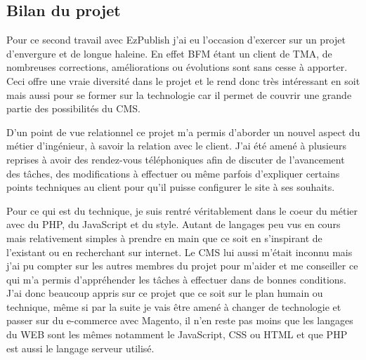 \documentclass[a4paper,11pt,twoside]{report}
\begin{document}
    \subsection*{Bilan du projet}
    Pour ce second travail avec EzPublish j'ai eu l'occasion d'exercer sur un projet d'envergure et de longue haleine. En effet BFM étant un client de TMA, de nombreuses corrections, améliorations ou évolutions sont sans cesse à apporter. Ceci offre une vraie diversité dans le projet et le rend donc très intéressant en soit mais aussi pour se former sur la technologie car il permet de couvrir une grande partie des possibilités du CMS. 
    
    D'un point de vue relationnel ce projet m'a permis d'aborder un nouvel aspect du métier d'ingénieur, à savoir la relation avec le client. J'ai été amené à plusieurs reprises à avoir des rendez-vous téléphoniques afin de discuter de l'avancement des tâches, des modifications à effectuer ou même parfois d'expliquer certains points techniques au client pour qu'il puisse configurer le site à ses souhaits. 
    
    Pour ce qui est du technique, je suis rentré véritablement dans le coeur du métier avec du PHP, du JavaScript et du style. Autant de langages peu vus en cours mais relativement simples à prendre en main que ce soit en s'inspirant de l'existant ou en recherchant sur internet. Le CMS lui aussi m'était inconnu mais j'ai pu compter sur les autres membres du projet pour m'aider et me conseiller ce qui m'a permis d'appréhender les tâches à effectuer dans de bonnes conditions. J'ai donc beaucoup appris sur ce projet que ce soit sur le plan humain ou technique, même si par la suite je vais être amené à changer de technologie et passer sur du e-commerce avec Magento, il n'en reste pas moins que les langages du WEB sont les mêmes notamment le JavaScript, CSS ou HTML et que PHP est aussi le langage serveur utilisé. 
    
\end{document}
